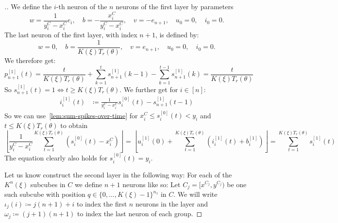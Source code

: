\begin{proof}[.]

  We define the \(i\)-th neuron of the \(n\) neurons of the first layer by parameters
  \[ w=\frac{1}{y^C_i-x^C_i}e_i, \quad b=-\frac{x^C_i}{y^C_i-x^C_i}, \quad v=-e_{n+1},\quad u_0=0, \quad i_0=0. \]
  The last neuron of the first layer, with index \(n+1\), is defined by:
  \begin{equation*}
    w=0, \quad b=\frac{1}{K(ξ)T_r(θ)}, \quad v=e_{n+1}, \quad u_0=0, \quad i_0=0.
  \end{equation*}
  We therefore get:
  \begin{equation*}
   p^{[1]}_{n+1}(t) = \frac{t}{K(ξ)T_r(θ)}+\sum_{k=1}^ts^{[1]}_{n+1}(k-1)-\sum_{k=1}^{t-1}s^{[1]}_{n+1}(k) = \frac{t}{K(ξ)T_r(θ)}
  \end{equation*}
  So \(s^{[1]}_{n+1}(t)=1⇔t≥K(ξ)T_r(θ)\).
  We further get for \(i∈[n]\):
  \begin{align*}
   i^{[1]}_i(t)&≔\frac{1}{y^C_i-x^C_i}s^{[0]}_i(t)-s^{[1]}_{n+1}(t-1)
  \end{align*}
  So we can use~\autoref{lem:sum-spikes-over-time} for \(x^C_i≤s^{[0]}_i(t)<y_i\) and \(t≤K(ξ)T_r(θ)\) to obtain
  \[ \left\lfloor \frac{1}{y^C_i-x^C_i}\sum_{t=1}^{K(ξ)T_r(θ)}(s^{[0]}_i(t)-x^C_i) \right\rfloor =\left\lfloor u^{[1]}_i(0)+\sum_{t=1}^{K(ξ)T_r(θ)}(i^{[1]}_i(t)+b^{[1]}_i) \right\rfloor = \sum_{t=1}^{K(ξ)T_r(θ)}s^{[1]}_i(t) \]
  The equation clearly also holds for \(s^{[0]}_i(t)=y_i\).




  Let us know construct the second layer in the following way: For each of the \(K^n(ξ)\) subcubes in \(C\) we define \(n+1\) neurons like so: Let \(C_j=[x^{C_j},y^{C_j})\) be one such subcube with position \(q∈\{0,…,K(ξ)-1\}^{n_1}\) in \(C\). We will write \(ι_j(i)≔j(n+1)+i\) to index the first \(n\) neurons in the layer and \(ω_j≔(j+1)(n+1)\) to index the last neuron of each group.


\end{proof}
